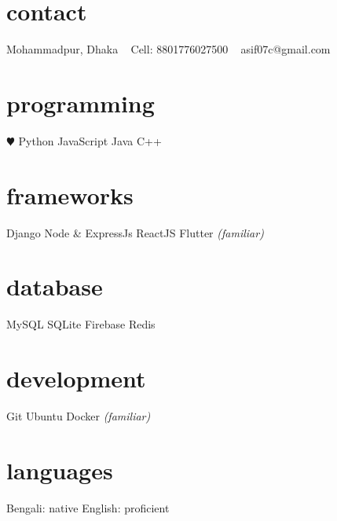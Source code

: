 \documentclass[]{exponential-cv}
\begin{document}


\begin{aside}
	\section{contact}
	Mohammadpur, Dhaka
	~
	Cell: 8801776027500
	~
	asif07c@gmail.com
	~
	\href{https://linkedin.com/in/aasifislam}{}
	~
	\section{programming}
	 {\color{red} $\varheartsuit$} Python
	JavaScript
	Java
	C++
	~
	\section{frameworks}
	Django
	Node \& ExpressJs
	ReactJS
	Flutter \emph{(familiar)}
	~
	\section{database}
	MySQL
	SQLite
	Firebase
	Redis
	~
	\section{development}
	Git
	Ubuntu
	Docker \emph{(familiar)}
	~
	\section{languages}
	Bengali: native
	English: proficient
\end{aside}
\end{document}
